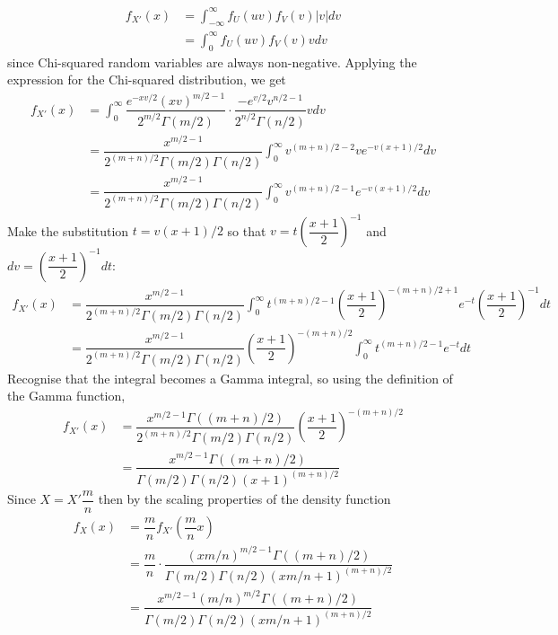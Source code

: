 \documentclass[11pt]{report} %
\begin{document}
\begin{align}
f_{X'}\left(x\right) &= \int_{-\infty}^{\infty}f_{U}\left(uv\right)f_{V}\left(v\right)\left|v\right|dv \\
&= \int_{0}^{\infty}f_{U}\left(uv\right)f_{V}\left(v\right)vdv
\end{align}
since Chi-squared random variables are always non-negative. Applying the expression for the Chi-squared distribution, we get
\begin{align}
f_{X'}\left(x\right) &= \int_{0}^{\infty}\dfrac{e^{-xv/2}\left(xv\right)^{m/2 - 1}}{2^{m/2}\Gamma\left(m/2\right)}\cdot\dfrac{-e^{v/2}v^{n/2 - 1}}{2^{n/2}\Gamma\left(n/2\right)}vdv \\
&= \dfrac{x^{m/2 - 1}}{2^{\left(m + n\right)/2}\Gamma\left(m/2\right)\Gamma\left(n/2\right)}\int_{0}^{\infty}v^{\left(m + n\right)/2-2}ve^{-v\left(x + 1\right)/2}dv \\
&= \dfrac{x^{m/2 - 1}}{2^{\left(m + n\right)/2}\Gamma\left(m/2\right)\Gamma\left(n/2\right)}\int_{0}^{\infty}v^{\left(m + n\right)/2-1}e^{-v\left(x + 1\right)/2}dv
\end{align}
Make the substitution $t = v\left(x + 1\right)/2$ so that $v = t\left(\dfrac{x + 1}{2}\right)^{-1}$ and $dv = \left(\dfrac{x + 1}{2}\right)^{-1}dt$:
\begin{align}
f_{X'}\left(x\right) &= \dfrac{x^{m/2 - 1}}{2^{\left(m + n\right)/2}\Gamma\left(m/2\right)\Gamma\left(n/2\right)}\int_{0}^{\infty}t^{\left(m + n\right)/2-1}\left(\dfrac{x + 1}{2}\right)^{-\left(m + n\right)/2 + 1}e^{-t}\left(\dfrac{x + 1}{2}\right)^{-1}dt \\
&= \dfrac{x^{m/2 - 1}}{2^{\left(m + n\right)/2}\Gamma\left(m/2\right)\Gamma\left(n/2\right)}\left(\dfrac{x + 1}{2}\right)^{-\left(m + n\right)/2}\int_{0}^{\infty}t^{\left(m + n\right)/2-1}e^{-t}dt
\end{align}
Recognise that the integral becomes a Gamma integral, so using the definition of the Gamma function,
\begin{align}
f_{X'}\left(x\right) &= \dfrac{x^{m/2 - 1}\Gamma\left(\left(m + n\right)/2\right)}{2^{\left(m + n\right)/2}\Gamma\left(m/2\right)\Gamma\left(n/2\right)}\left(\dfrac{x + 1}{2}\right)^{-\left(m + n\right)/2} \\
&= \dfrac{x^{m/2 - 1}\Gamma\left(\left(m + n\right)/2\right)}{\Gamma\left(m/2\right)\Gamma\left(n/2\right)\left(x + 1\right)^{\left(m + n\right)/2}} 
\end{align}
Since $X = X'\dfrac{m}{n}$ then by the scaling properties of the density function
\begin{align}
f_{X}\left(x\right) &= \dfrac{m}{n}f_{X'}\left(\dfrac{m}{n}x\right) \\
&= \dfrac{m}{n}\cdot\dfrac{\left(xm/n\right)^{m/2 - 1}\Gamma\left(\left(m + n\right)/2\right)}{\Gamma\left(m/2\right)\Gamma\left(n/2\right)\left(xm/n + 1\right)^{\left(m + n\right)/2}} \\
&= \dfrac{x^{m/2 - 1}\left(m/n\right)^{m/2}\Gamma\left(\left(m + n\right)/2\right)}{\Gamma\left(m/2\right)\Gamma\left(n/2\right)\left(xm/n + 1\right)^{\left(m + n\right)/2}}
\end{align}
\end{document}

